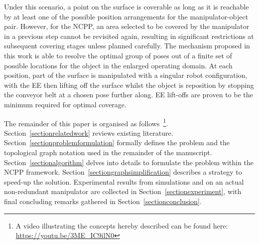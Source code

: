 \documentclass[letterpaper, 10pt, conference]{ieeeconf}
\begin{document}
Under this scenario, a point on the surface is coverable as long as it is reachable by at least one of the possible position arrangements for the manipulator-object pair. However, for the NCPP, an area selected to be covered by the manipulator in a previous step cannot be revisited again, resulting in significant restrictions at subsequent covering stages unless planned carefully. The mechanism proposed in this work is able to resolve the optimal group of poses out of a finite set of possible locations for the object in the enlarged operating domain. At each position, part of the surface is manipulated with a singular robot configuration, with the EE then lifting off the surface whilst the object is reposition by stopping the conveyor belt at a chosen pose further along. 
EE lift-offs are proven to be the minimum required for optimal coverage. 

The remainder of this paper is organised as follows~\footnote{A video illustrating the concepts hereby described can be found here: \url{https://youtu.be/3ME_IC9ilN0}}.
Section~\ref{sectionrelatedwork} reviews existing literature. 
Section~\ref{sectionproblemformulation} formally defines the problem and the topological graph notation used in the remainder of the manuscript. 
Section~\ref{sectionalgorithm} delves into details to formulate the problem within the NCPP framework. 
Section~\ref{sectiongraphsimplification} describes a strategy to speed-up the solution. Experimental results from simulations and on an actual non-redundant manipulator are collected in Section~\ref{sectionexperiment}, with final concluding remarks gathered in Section~\ref{sectionconclusion}. 
\end{document}
